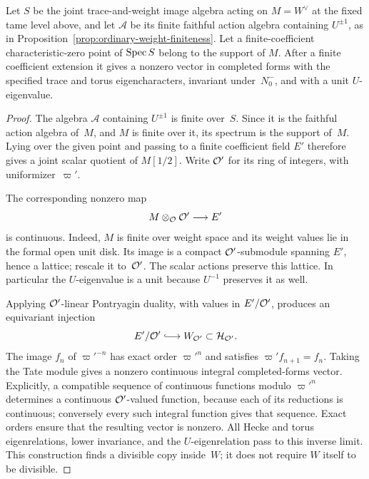 \begin{lemma}
\label{lem:eigenvector-specialization}
Let $S$ be the joint trace-and-weight image algebra acting on $M=W^\vee$
at the fixed tame level above, and let $\mathcal A$ be its finite faithful
action algebra containing $U^{\pm1}$, as in
Proposition~\ref{prop:ordinary-weight-finiteness}.  Let a
finite-coefficient characteristic-zero point of $\operatorname{Spec} S$ belong to
the support of $M$.  After a finite coefficient extension it gives a
nonzero vector in completed forms with the
specified trace and torus eigencharacters, invariant under~$N_0^-$,
and with a unit $U$-eigenvalue.
\end{lemma}
\begin{proof}
The algebra $\mathcal A$ containing $U^{\pm1}$ is finite over~$S$.
Since it is the faithful action algebra of~$M$, and $M$ is finite over
it, its spectrum is the support of~$M$.  Lying over the given point
and passing to a finite coefficient field $E'$ therefore gives a
joint scalar quotient of $M[1/2]$.  Write $\mathcal O'$ for its ring of
integers, with uniformizer~$\varpi'$.

The corresponding nonzero map
\[
                    M\otimes_{\mathcal O}\mathcal O'\longrightarrow E'
\]
is continuous.  Indeed, $M$ is finite over weight space and its weight
values lie in the formal open unit disk.  Its image is a compact
$\mathcal O'$-submodule spanning $E'$, hence a lattice; rescale it to~$\mathcal O'$.
The scalar actions preserve this lattice.  In particular the
$U$-eigenvalue is a unit because $U^{-1}$ preserves it as well.

Applying $\mathcal O'$-linear Pontryagin duality, with values in $E'/\mathcal O'$,
produces an equivariant injection
\[
               E'/\OO'\lhook\joinrel\longrightarrow
                    W_{\OO'}\subset\mathcal H_{\OO'}.
\]
The image $f_n$ of $\varpi'^{-n}$ has exact order $\varpi'^n$ and
satisfies $\varpi'f_{n+1}=f_n$.  Taking the Tate module gives a nonzero
continuous integral completed-forms vector.  Explicitly, a compatible
sequence of continuous functions modulo $\varpi'^n$ determines a
continuous $\mathcal O'$-valued function, because each of its reductions is
continuous; conversely every such integral function gives that
sequence.  Exact orders ensure that the resulting vector is nonzero.
All Hecke and torus eigenrelations, lower invariance, and the
$U$-eigenrelation pass to this inverse limit.  This construction finds
a divisible copy inside~$W$; it does not require $W$ itself to be
divisible.
\end{proof}

